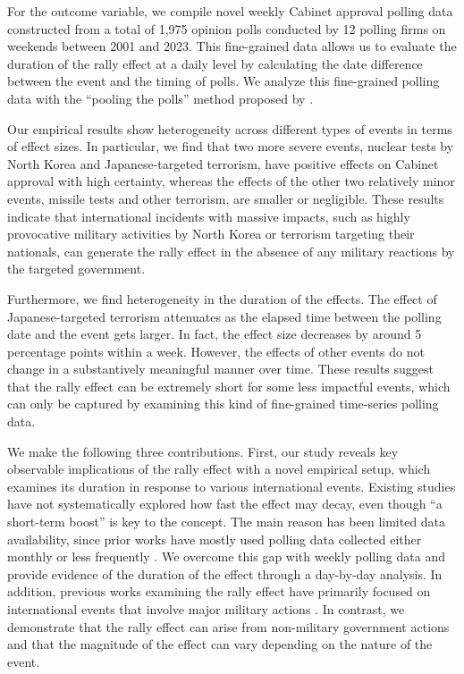 \documentclass[letterpaper,12pt]{scrartcl}
\begin{document}
For the outcome variable, we compile novel weekly Cabinet approval polling data constructed from a total of 1,975 opinion polls conducted by 12 polling firms on weekends between 2001 and 2023. This fine-grained data allows us to evaluate the duration of the rally effect at a daily level by calculating the date difference between the event and the timing of polls. We analyze this fine-grained polling data with the ``pooling the polls'' method proposed by \citet{Jackman2005AustJPolitSci}.

Our empirical results show heterogeneity across different types of events in terms of effect sizes. In particular, we find that two more severe events, nuclear tests by North Korea and Japanese-targeted terrorism, have positive effects on Cabinet approval with high certainty, whereas the effects of the other two relatively minor events, missile tests and other terrorism, are smaller or negligible. These results indicate that international incidents with massive impacts, such as highly provocative military activities by North Korea or terrorism targeting their nationals, can generate the rally effect in the absence of any military reactions by the targeted government.

Furthermore, we find heterogeneity in the duration of the effects. The effect of Japanese-targeted terrorism attenuates as the elapsed time between the polling date and the event gets larger. In fact, the effect size decreases by around 5 percentage points within a week. However, the effects of other events do not change in a substantively meaningful manner over time. These results suggest that the rally effect can be extremely short for some less impactful events, which can only be captured by examining this kind of fine-grained time-series polling data.

We make the following three contributions. First, our study reveals key observable implications of the rally effect with a novel empirical setup, which examines its duration in response to various international events. Existing studies have not systematically explored how fast the effect may decay, even though ``a short-term boost'' is key to the concept. The main reason has been limited data availability, since prior works have mostly used polling data collected either monthly \citep{marra1990,Parker1995POQ,Baker2001JCR,Lai2005ISQ} or less frequently \citep{lee1977,Kam2008POQ}. We overcome this gap with weekly polling data and provide evidence of the duration of the effect through a day-by-day analysis. In addition, previous works examining the rally effect have primarily focused on international events that involve major military actions \citep[e.g.,][]{oneal1996,Lai2005ISQ}. In contrast, we demonstrate that the rally effect can arise from non-military government actions and that the magnitude of the effect can vary depending on the nature of the event.
\end{document}
